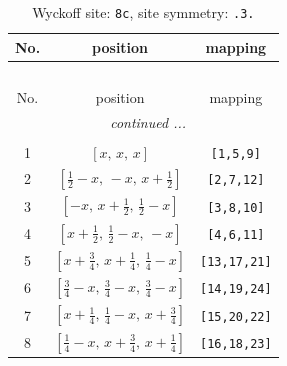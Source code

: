 \documentclass[fleqn,8pt]{jsarticle}
\begin{document}
\renewcommand{\arraystretch}{1.2}
\begin{longtable}{ccc}
\caption{Wyckoff site: {\tt 8c}, site symmetry: {\tt .3.}}
 \\
 \hline \hline
No. & position & mapping \\ \hline \endfirsthead

\multicolumn{2}{l}{\tablename\ \thetable{}} \\
 \hline \hline
No. & position & mapping \\ \hline \endhead

 \hline \hline
\multicolumn{2}{r}{\footnotesize\it continued ...} \\ \endfoot

 \hline \hline
\multicolumn{2}{r}{} \\ \endlastfoot

1 & $\left[ x,\, x,\, x \right]$ & {\tt [1,5,9]} \\ \hline
2 & $\left[ \frac{1}{2} - x,\, - x,\, x + \frac{1}{2} \right]$ & {\tt [2,7,12]} \\ \hline
3 & $\left[ - x,\, x + \frac{1}{2},\, \frac{1}{2} - x \right]$ & {\tt [3,8,10]} \\ \hline
4 & $\left[ x + \frac{1}{2},\, \frac{1}{2} - x,\, - x \right]$ & {\tt [4,6,11]} \\ \hline
5 & $\left[ x + \frac{3}{4},\, x + \frac{1}{4},\, \frac{1}{4} - x \right]$ & {\tt [13,17,21]} \\ \hline
6 & $\left[ \frac{3}{4} - x,\, \frac{3}{4} - x,\, \frac{3}{4} - x \right]$ & {\tt [14,19,24]} \\ \hline
7 & $\left[ x + \frac{1}{4},\, \frac{1}{4} - x,\, x + \frac{3}{4} \right]$ & {\tt [15,20,22]} \\ \hline
8 & $\left[ \frac{1}{4} - x,\, x + \frac{3}{4},\, x + \frac{1}{4} \right]$ & {\tt [16,18,23]} \\
\end{longtable}
\renewcommand{\arraystretch}{1.2}
\end{document}
